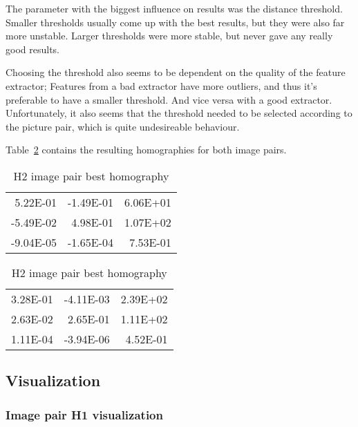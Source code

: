 The parameter with the biggest influence on results was the distance threshold.
Smaller thresholds usually come up with the best results, but they were also
far more unstable. Larger thresholds were more stable, but never gave any
really good results.

Choosing the threshold also seems to be dependent on the quality of the feature
extractor; Features from a bad extractor have more outliers, and thus it's
preferable to have a smaller threshold. And vice versa with a good extractor.
Unfortunately, it also seems that the threshold needed to be selected according
to the picture pair, which is quite undesireable behaviour.

Table~\ref{tab:homographies} contains the resulting homographies for both image
pairs.

\begin{table}[H]
  \caption{The best homographies for both image pairs, obtained by the RANSAC
  algorithm}\label{tab:homographies}
  \begin{minipage}{.5\linewidth}
    \caption{H1 image pair best homography}
    \centering
    \begin{tabular}{rrr}
      \toprule
       5.22E-01 & -1.49E-01 & 6.06E+01 \\
      -5.49E-02 &  4.98E-01 & 1.07E+02 \\
      -9.04E-05 & -1.65E-04 & 7.53E-01 \\
      \bottomrule
    \end{tabular}
  \end{minipage}
  \begin{minipage}{.5\linewidth}
    \centering
    \caption{H2 image pair best homography}
    \begin{tabular}{rrr}
      \toprule
      3.28E-01 & -4.11E-03 & 2.39E+02 \\
      2.63E-02 &  2.65E-01 & 1.11E+02 \\
      1.11E-04 & -3.94E-06 & 4.52E-01 \\
      \bottomrule
    \end{tabular}
  \end{minipage} 
\end{table}

\subsection{Visualization}

\subsubsection{Image pair H1 visualization}

